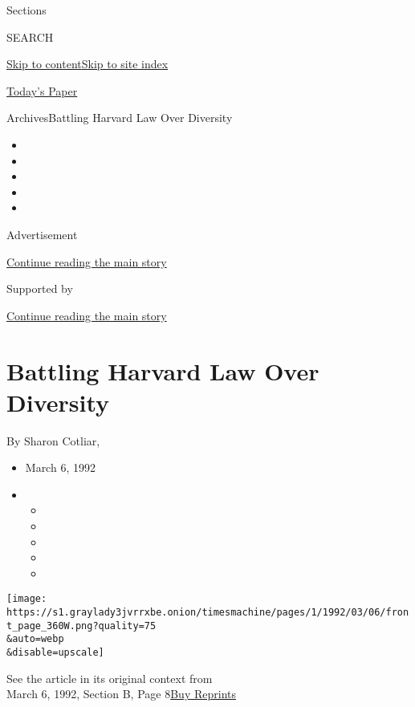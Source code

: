 Sections

SEARCH

\protect\hyperlink{site-content}{Skip to
content}\protect\hyperlink{site-index}{Skip to site index}

\href{https://myaccount.nytimes3xbfgragh.onion/auth/login?response_type=cookie\&client_id=vi}{}

\href{https://www.nytimes3xbfgragh.onion/section/todayspaper}{Today's
Paper}

Archives\textbar{}Battling Harvard Law Over Diversity

\begin{itemize}
\item
\item
\item
\item
\item
\end{itemize}

Advertisement

\protect\hyperlink{after-top}{Continue reading the main story}

Supported by

\protect\hyperlink{after-sponsor}{Continue reading the main story}

\hypertarget{battling-harvard-law-over-diversity}{%
\section{Battling Harvard Law Over
Diversity}\label{battling-harvard-law-over-diversity}}

By Sharon Cotliar,

\begin{itemize}
\item
  March 6, 1992
\item
  \begin{itemize}
  \item
  \item
  \item
  \item
  \item
  \end{itemize}
\end{itemize}

\texttt{[image: https://s1.graylady3jvrrxbe.onion/timesmachine/pages/1/1992/03/06/front\_page\_360W.png?quality=75\\\&auto=webp\\\&disable=upscale]}

See the article in its original context from\\
March 6, 1992, Section B, Page
8\href{https://store.nytimes3xbfgragh.onion/collections/new-york-times-page-reprints?utm_source=nytimes\&utm_medium=article-page\&utm_campaign=reprints}{Buy
Reprints}

